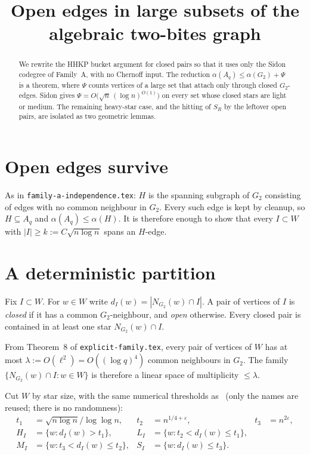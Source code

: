 \documentclass[11pt]{article}
\title{Open edges in large subsets of the algebraic two-bites graph}
\date{}
\theoremstyle{definition}
\newcommand{\eps}{\varepsilon}
\begin{document}
\maketitle

\begin{abstract}
We rewrite the HHKP bucket argument for closed pairs so that it uses only the Sidon codegree of Family~A, with no Chernoff input.
The reduction $\alpha(A_q)\le\alpha(G_2)+\Psi$ is a theorem, where $\Psi$ counts vertices of a large set that attach only through closed $G_2$-edges.
Sidon gives $\Psi=O\bigl(\sqrt{n}\,(\log n)^{O(1)}\bigr)$ on every set whose closed stars are light or medium.
The remaining heavy-star case, and the hitting of $S_R$ by the leftover open pairs, are isolated as two geometric lemmas.
\end{abstract}

\section{Open edges survive}

As in \texttt{family-a-independence.tex}: $H$ is the spanning subgraph of $G_2$ consisting of edges with no common neighbour in $G_2$.
Every such edge is kept by cleanup, so $H\subseteq A_q$ and $\alpha(A_q)\le\alpha(H)$.
It is therefore enough to show that every $I\subset W$ with $|I|\ge k:=C\sqrt{n\log n}$ spans an $H$-edge.

\section{A deterministic partition}

Fix $I\subset W$.
For $w\in W$ write $d_I(w)=|N_{G_2}(w)\cap I|$.
A pair of vertices of $I$ is \emph{closed} if it has a common $G_2$-neighbour, and \emph{open} otherwise.
Every closed pair is contained in at least one star $N_{G_2}(w)\cap I$.

From Theorem~8 of \texttt{explicit-family.tex}, every pair of vertices of $W$ has at most $\lambda:=O(\ell^{2})=O((\log q)^{4})$ common neighbours in $G_2$.
The family $\{N_{G_2}(w)\cap I:w\in W\}$ is therefore a linear space of multiplicity $\le\lambda$.

Cut $W$ by star size, with the same numerical thresholds as~\cite{HHKP2025} (only the names are reused; there is no randomness):
\begin{align*}
  t_{1}&=\sqrt{n\log n}/\log\log n,
  &
  t_{2}&=n^{1/4+\eps},
  &
  t_{3}&=n^{2\eps},\\
  H_I&=\{w:d_I(w)>t_{1}\},
  &
  L_I&=\{w:t_{2}<d_I(w)\le t_{1}\},\\
  M_I&=\{w:t_{3}<d_I(w)\le t_{2}\},
  &
  S_I&=\{w:d_I(w)\le t_{3}\}.
\end{align*}
\end{document}
